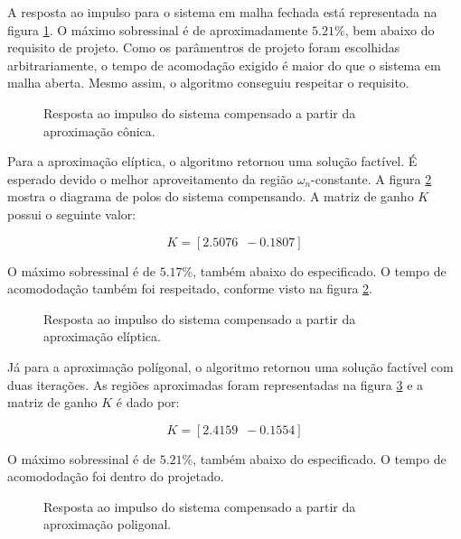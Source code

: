 A resposta ao impulso para o sistema em malha fechada está representada na figura \ref{fig:ImpulseC}. O máximo sobressinal é de aproximadamente $5.21\%$, bem abaixo do requisito de projeto.  Como os parâmentros de projeto foram escolhidas arbitrariamente, o tempo de acomodação exigido é maior do que o sistema em malha aberta. Mesmo assim, o algoritmo conseguiu respeitar o requisito.

\begin{figure}[!ht]
  \centering
  
  \caption{Resposta ao impulso do sistema compensado a partir da aproximação cônica.}
  \label{fig:ImpulseC}
\end{figure}

Para a aproximação elíptica, o algoritmo retornou uma solução factível. É esperado devido o melhor aproveitamento da região $\omega_n$-constante. A figura \ref{fig:ImpulseE} mostra o diagrama de polos do sistema compensando. A matriz de ganho $K$ possui o seguinte valor:

\begin{equation}
  K = \left[2.5076 \enspace -0.1807\right]\label{res:GanhoE}
\end{equation}

O máximo sobressinal é de $5.17\%$, também abaixo do especificado. O tempo de acomododação também foi respeitado, conforme visto na figura \ref{fig:ImpulseE}.

\begin{figure}[!ht]
  \centering
  
  \caption{Resposta ao impulso do sistema compensado a partir da aproximação elíptica.}
  \label{fig:ImpulseE}
\end{figure}

Já para a aproximação polígonal, o algoritmo retornou uma solução factível com duas iterações. As regiões aproximadas foram representadas na figura \ref{fig:ImpulseP} e a matriz de ganho $K$ é dado por:

\begin{equation}
  K = \left[2.4159 \enspace -0.1554\right]\label{res:GanhoP}
\end{equation}

O máximo sobressinal é de $5.21\%$, também abaixo do especificado. O tempo de acomododação foi dentro do projetado.

\begin{figure}[!ht]
  \centering
  
  \caption{Resposta ao impulso do sistema compensado a partir da aproximação poligonal.}
  \label{fig:ImpulseP}
\end{figure}

